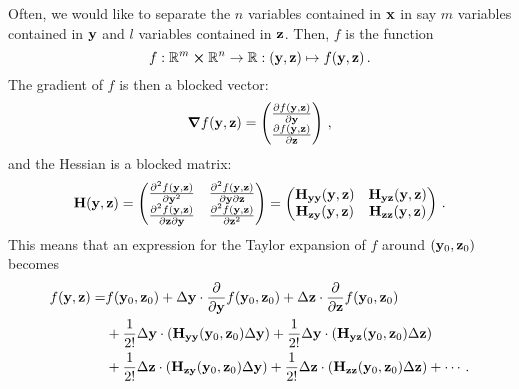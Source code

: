         Often, we would like to separate the $n$ variables contained in $\vb{x}$ in say $m$ variables contained in $\vb{y}$ and $l$ variables contained in $\vb{z}$. Then, $f$ is the function
        \begin{equation}
            f: \mathbb{R}^m \cross \mathbb{R}^n \rightarrow \mathbb{R}: (\vb{y}, \vb{z}) \mapsto f(\vb{y}, \vb{z}) \thinspace .
        \end{equation}
        The gradient of $f$ is then a blocked vector:
        \begin{equation}
            \grad{f(\vb{y}, \vb{z})} =
            \begin{pmatrix}
                \pdv{f(\vb{y}, \vb{z})}{\vb{y}} \\
                \pdv{f(\vb{y}, \vb{z})}{\vb{z}}
            \end{pmatrix}
            \thinspace ,
        \end{equation}
        and the Hessian is a blocked matrix:
        \begin{equation}
            \vb{H}(\vb{y}, \vb{z}) =
            \begin{pmatrix}
                \pdv[2]{f(\vb{y}, \vb{z})}{\vb{y}} & \pdv{f(\vb{y}, \vb{z})}{\vb{y}}{\vb{z}} \\
                \pdv{f(\vb{y}, \vb{z})}{\vb{z}}{\vb{y}} & \pdv[2]{f(\vb{y}, \vb{z})}{\vb{z}}
            \end{pmatrix}
            =
            \begin{pmatrix}
                \vb{H}_{\vb{y} \vb{y}}(\vb{y}, \vb{z}) & \vb{H}_{\vb{y} \vb{z}}(\vb{y}, \vb{z}) \\
                \vb{H}_{\vb{z} \vb{y}}(\vb{y}, \vb{z}) & \vb{H}_{\vb{z} \vb{z}}(\vb{y}, \vb{z})
            \end{pmatrix} \thinspace .
        \end{equation}
        This means that an expression for the Taylor expansion of $f$ around $(\vb{y}_0, \vb{z}_0)$ becomes
        \begin{equation}
            \begin{split}
                f(\vb{y}, \vb{z}) = &f(\vb{y}_0, \vb{z}_0) + \Delta \vb{y} \cdot \pdv{\vb{y}} f(\vb{y}_0, \vb{z}_0) + \Delta \vb{z} \cdot \pdv{\vb{z}} f(\vb{y}_0, \vb{z}_0) \\
                &+ \frac{1}{2!} \Delta \vb{y} \cdot (\vb{H}_{\vb{y} \vb{y}}(\vb{y}_0, \vb{z}_0) \Delta \vb{y}) + \frac{1}{2!} \Delta \vb{y} \cdot (\vb{H}_{\vb{y} \vb{z}}(\vb{y}_0, \vb{z}_0) \Delta \vb{z}) \\
                &+ \frac{1}{2!} \Delta \vb{z} \cdot (\vb{H}_{\vb{z} \vb{y}}(\vb{y}_0, \vb{z}_0) \Delta \vb{y}) + \frac{1}{2!} \Delta \vb{z} \cdot (\vb{H}_{\vb{z} \vb{z}}(\vb{y}_0, \vb{z}_0) \Delta \vb{z}) + \cdots \thinspace .
            \end{split}
        \end{equation}

